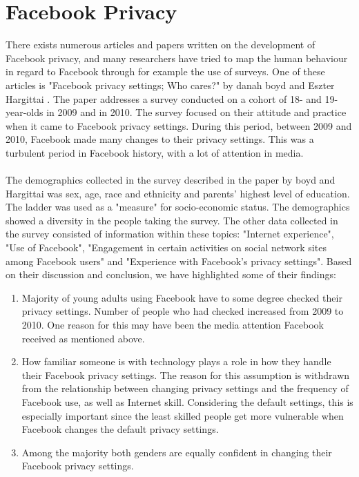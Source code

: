 \section{Facebook Privacy}
\label{sec:relatedwork_facebookprivacy}
There exists numerous articles and papers written on the development of Facebook privacy, and many researchers have tried to map the human behaviour in regard to Facebook through for example the use of surveys. One of these articles is "Facebook privacy settings; Who cares?" by danah boyd and Eszter Hargittai \cite{whocares}. The paper addresses a survey conducted on a cohort of 18- and 19-year-olds in 2009 and in 2010. The survey focused on their attitude and practice when it came to Facebook privacy settings. During this period, between 2009 and 2010, Facebook made many changes to their privacy settings. This was a turbulent period in Facebook history, with a lot of attention in media.

\paragraph{}
The demographics collected in the survey described in the paper by boyd and Hargittai was sex, age, race and ethnicity and parents' highest level of education. The ladder was used as a "measure" for socio-economic status. The demographics showed a diversity in the people taking the survey. The other data collected in the survey consisted of information within these topics: "Internet experience", "Use of Facebook", "Engagement in certain activities on social network sites among Facebook users" and "Experience with Facebook's privacy settings". Based on their discussion and conclusion, we have highlighted some of their findings: 

\begin{enumerate}
\item Majority of young adults using Facebook have to some degree checked their privacy settings. Number of people who had checked increased from 2009 to 2010. One reason for this may have been the media attention Facebook received as mentioned above. 
\item How familiar someone is with technology plays a role in how they handle their Facebook privacy settings. The reason for this assumption is withdrawn from the relationship between changing privacy settings and the frequency of Facebook use, as well as Internet skill. Considering the default settings, this is especially important since the least skilled people get more vulnerable when Facebook changes the default privacy settings. 
\item Among the majority both genders are equally confident in changing their Facebook privacy settings. 
\end{enumerate}

